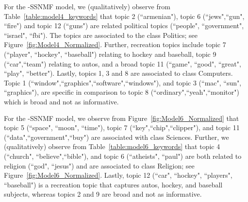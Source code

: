 \documentclass[twocolumn,10pt]{article}
\begin{document}
For the -SSNMF model, we (qualitatively) observe from Table~\ref{table:model4_keywords} that topic 2 (``armenian"), topic 6 (``jews",``gun", ``fire") and topic 12 (``guns") are related political topics (``people", ``government", ``israel", ``fbi"). 
The topics are associated to the class Politics; see Figure~\ref{fig:Model4_Normalized}.
Further, recreation topics include topic 7 (``player", ``hockey", ``baseball") relating to hockey and baseball, topic 9 (``car",``team") relating to autos, and a broad topic 11 (``game", ``good", ``great", ``play", ``better").
Lastly, topics 1, 3 and 8 are associated to class Computers. Topic 1 (``window",``graphics",``software",``windows"), and topic 3  (``mac", ``sun", ``graphics"), are specific in comparison to topic 8 (``ordinary",``yeah",``monitor") which is broad and not as informative.

For the -SSNMF model, we observe from Figure~\ref{fig:Model6_Normalized} that topic 5 (``space", ``moon", ``time"), topic 7 (``key",``chip",``clipper"), and topic 11 (``data",``government",``buy") are associated with class Sciences.
Further, we (qualitatively) observe from Table~\ref{table:model6_keywords} that topic 4 (``church", ``believe",``bible"), and topic 6 (``atheists", ``paul") are both related to religion (``god", ``jesus") and are associated to class Religion; see Figure~\ref{fig:Model6_Normalized}.
Lastly, topic 12 (``car", ``hockey", ``players", ``baseball") is a recreation topic that captures autos, hockey, and baseball subjects, whereas topics 2 and 9 are broad and not as informative.
\end{document}
